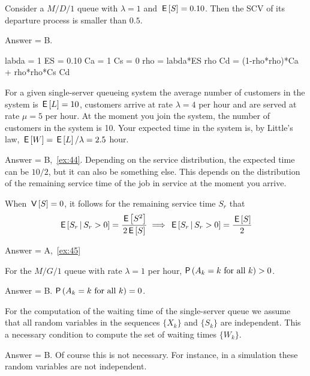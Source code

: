 \begin{exercise}[201904]
 Consider a $M/D/1$ queue with $\lambda=1$ and $\,\mathsf{E}\left[S\right] = 0.10$. Then the SCV of its departure process is smaller than $0.5$.
\begin{solution}
 Answer = B.
 \begin{pyconsole}
labda = 1
ES = 0.10
Ca = 1
Cs = 0
rho = labda*ES
rho
Cd = (1-rho*rho)*Ca + rho*rho*Cs
Cd
 
 \end{pyconsole}
\end{solution}
\end{exercise}

\begin{exercise}[201904] 
For a given single-server queueing system the average number of customers in the system is $\,\mathsf{E}\left[L\right] = 10$, customers arrive at rate $\lambda=4$ per hour and are served at rate $\mu=5$ per hour.
 At the moment you join the system, the number of customers in the system is 10.
 Your expected time in the system is, by Little's law, $\,\mathsf{E}\left[W\right] = \,\mathsf{E}\left[L\right] /\lambda = 2.5$ hour.
\begin{solution} Answer = B,~\cref{ex:44}.
 Depending on the service distribution, the expected time can be $10/2$, but it can also be something else.
 This depends on the distribution of the remaining service time of the job in service at the moment you arrive.
\end{solution}
\end{exercise}

\begin{exercise}[201904]
 When $\,\mathsf{V}\left[S\right] = 0$, it follows for the remaining service time $S_r$ that
\begin{equation*}
\,\mathsf{E}\left[S_r\,\middle|\, S_r>0\right] = \frac{\,\mathsf{E}\left[S^2\right]}{2 \,\mathsf{E}\left[S\right]} \implies \,\mathsf{E}\left[S_r\,\middle|\, S_r>0\right] = \frac{\,\mathsf{E}\left[S\right]}2
\end{equation*}
\begin{solution} Answer = A,~\cref{ex:45}
\end{solution}
\end{exercise}


\begin{exercise}[201907]
 For the $M/G/1$ queue with rate $\lambda=1$ per hour, $\P{A_k= k \text{ for all $k$}} > 0$. 
\begin{solution}
Answer = B. $\P{A_k= k \text{ for all $k$}} = 0$. 
\end{solution}
\end{exercise}

\begin{exercise}[201907]
 For the computation of the waiting time of the single-server queue we assume that all random variables in the sequences $\{X_k\}$ and $\{S_k\}$ are independent.
 This a necessary condition to compute the set of waiting times $\{W_k\}$.
\begin{solution}
 Answer = B.
 Of course this is not necessary.
 For instance, in a simulation these random variables are not independent. 
\end{solution}
\end{exercise}

